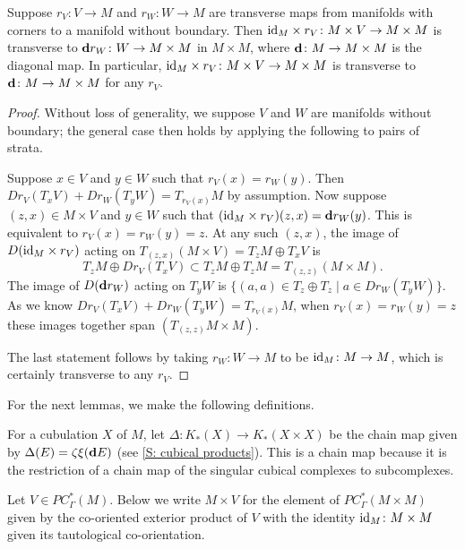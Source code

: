 \begin{lemma}\label{L: M times transverse diag}
	Suppose $r_V \colon V \to M$ and $r_W \colon W \to M$ are transverse maps from manifolds with corners to a manifold without boundary.
	Then $\mathrm{id}_M \times r_V \colon M \times V \to M \times M$ is transverse to $\mathbf{d} r_W \colon W \to M \times M$ in $M \times M$, where $\mathbf{d} \colon M \to M \times M$ is the diagonal map.
	In particular, $\mathrm{id}_M \times r_V \colon M \times V \to M \times M$ is transverse to $\mathbf{d} \colon M \to M \times M$ for any $r_V$.
\end{lemma}

\begin{proof}
	Without loss of generality, we suppose $V$ and $W$ are manifolds without boundary; the general case then holds by applying the following to pairs of strata.

	Suppose $x \in V$ and $y \in W$ such that $r_V(x) = r_W(y)$.
	Then $Dr_V(T_xV)+Dr_W(T_yW) = T_{r_V(x)}M$ by assumption.
	Now suppose $(z,x) \in M \times V$ and $y \in W$ such that $(\mathrm{id}_M \times r_V) (z,x) = \mathbf{d} r_W(y)$.
	This is equivalent to $r_V(x) = r_W(y) = z$.
	At any such $(z,x)$, the image of $D(\mathrm{id}_M \times r_V)$ acting on $T_{(z,x)}(M \times V) = T_zM \oplus T_xV$ is $$T_zM \oplus Dr_V(T_xV) \subset T_zM \oplus T_zM = T_{(z,z)}(M \times M).$$
	The image of $D(\mathbf{d} r_W)$ acting on $T_yW$ is $\{(a,a) \in T_z \oplus T_z \mid a \in Dr_W(T_yW)\}$.
	As we know $Dr_V(T_xV)+Dr_W(T_yW) = T_{r_V(x)}M$, when $r_V(x) = r_W(y) = z$ these images together span $(T_{(z,z)}M \times M)$.

	The last statement follows by taking $r_W \colon W \to M$ to be $\mathrm{id}_M \colon M \to M$, which is certainly transverse to any $r_V$.
\end{proof}

For the next lemmas, we make the following definitions.

\begin{definition}
	For a cubulation $X$ of $M$, let $\Delta \colon K_*(X) \to K_*(X \times X)$ be the chain map given by $\Delta(E) = \zeta\xi(\mathbf{d} E)$ (see \cref{S: cubical products}).
	This is a chain map because it is the restriction of a chain map of the singular cubical complexes to subcomplexes.
\end{definition}

\begin{definition}
	Let $V \in PC^*_\Gamma(M)$.
	Below we write $M \times V$ for the element of $PC^*_\Gamma(M \times M)$ given by the co-oriented exterior product of $V$ with the identity $\mathrm{id}_M \colon M \times M$ given its tautological co-orientation.
\end{definition}

